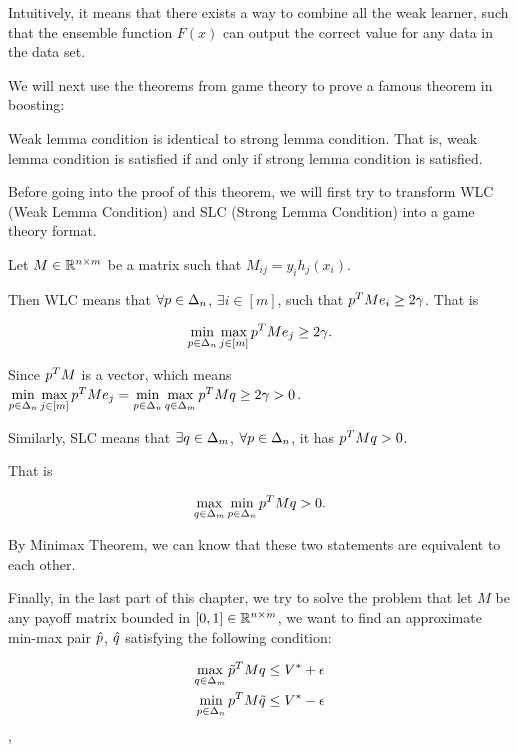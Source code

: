 \documentclass[main.tex]{subfiles}
\begin{document}
Intuitively, it means that there exists a way to combine all the weak learner, such that the ensemble function $F(x)$ can output the correct value for any data in the data set.

We will next use the theorems from game theory to prove a famous theorem in boosting:

\begin{theorem}
Weak lemma condition is identical to strong lemma condition. That is, weak lemma condition is satisfied if and only if strong lemma condition is satisfied.
\end{theorem}

Before going into the proof of this theorem, we will first try to transform WLC (Weak Lemma Condition) and SLC (Strong Lemma Condition) into a game theory format.

Let $M \in \mathbb{R}^{n\times m}$ be a matrix such that $M_{ij} = y_i h_j(x_i)$. 

Then WLC means that $\forall p \in \Delta_n$, $\exists i \in [m]$, such that $p^T M e_i \geq 2\gamma$. That is

\begin{equation*}
\min\limits_{p \in \Delta_n} \max\limits_{j \in [m]} p^T M e_j \geq 2\gamma.
\end{equation*}

Since $p^T M $ is a vector, which means $\min\limits_{p \in \Delta_n} \max\limits_{j \in [m]} p^T M e_j = \min\limits_{p \in \Delta_n} \max\limits_{q \in \Delta_m} p^T M q \geq 2\gamma > 0$.

Similarly, SLC means that $\exists q \in \Delta_m$, $\forall p \in \Delta_n$, it has $p^T M q > 0$.

That is 

\begin{equation*}
\max\limits_{q \in \Delta_m} \min\limits_{p \in \Delta_n} p^T M q > 0.
\end{equation*}

By Minimax Theorem, we can know that these two statements are equivalent to each other.

Finally, in the last part of this chapter, we try to solve the problem that let $M$ be any payoff matrix bounded in $[0,1] \in \mathbb{R}^{n\times m}$, we want to find an approximate min-max pair $\hat{p}$, $\hat{q}$ satisfying the following condition:

\begin{equation*}
\begin{aligned}
\max\limits_{q \in \Delta_m} \tilde{p}^T M q \leq V^* + \epsilon \\
\min\limits_{p \in \Delta_n} p^T M \tilde{q} \leq V^* - \epsilon 
\end{aligned}
\end{equation*},
\end{document}
